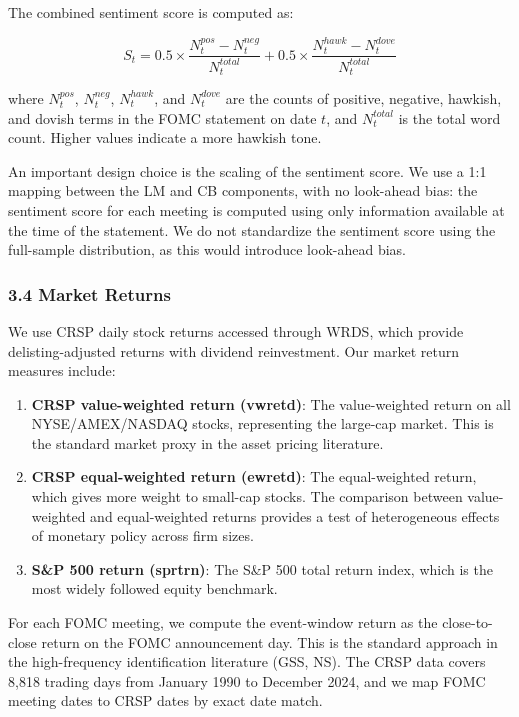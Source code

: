 \documentclass[
]{article}
\begin{document}
The combined sentiment score is computed as:

\[S_t = 0.5 \times \frac{N^{pos}_t - N^{neg}_t}{N^{total}_t} + 0.5 \times \frac{N^{hawk}_t - N^{dove}_t}{N^{total}_t}\]

where \(N^{pos}_t\), \(N^{neg}_t\), \(N^{hawk}_t\), and \(N^{dove}_t\)
are the counts of positive, negative, hawkish, and dovish terms in the
FOMC statement on date \(t\), and \(N^{total}_t\) is the total word
count. Higher values indicate a more hawkish tone.

An important design choice is the scaling of the sentiment score. We use
a 1:1 mapping between the LM and CB components, with no look-ahead bias:
the sentiment score for each meeting is computed using only information
available at the time of the statement. We do not standardize the
sentiment score using the full-sample distribution, as this would
introduce look-ahead bias.

\subsubsection{3.4 Market Returns}\label{market-returns}

We use CRSP daily stock returns accessed through WRDS, which provide
delisting-adjusted returns with dividend reinvestment. Our market return
measures include:

\begin{enumerate}
\def\labelenumi{\arabic{enumi}.}
\item
  \textbf{CRSP value-weighted return (vwretd)}: The value-weighted
  return on all NYSE/AMEX/NASDAQ stocks, representing the large-cap
  market. This is the standard market proxy in the asset pricing
  literature.
\item
  \textbf{CRSP equal-weighted return (ewretd)}: The equal-weighted
  return, which gives more weight to small-cap stocks. The comparison
  between value-weighted and equal-weighted returns provides a test of
  heterogeneous effects of monetary policy across firm sizes.
\item
  \textbf{S\&P 500 return (sprtrn)}: The S\&P 500 total return index,
  which is the most widely followed equity benchmark.
\end{enumerate}

For each FOMC meeting, we compute the event-window return as the
close-to-close return on the FOMC announcement day. This is the standard
approach in the high-frequency identification literature (GSS, NS). The
CRSP data covers 8,818 trading days from January 1990 to December 2024,
and we map FOMC meeting dates to CRSP dates by exact date match.
\end{document}
